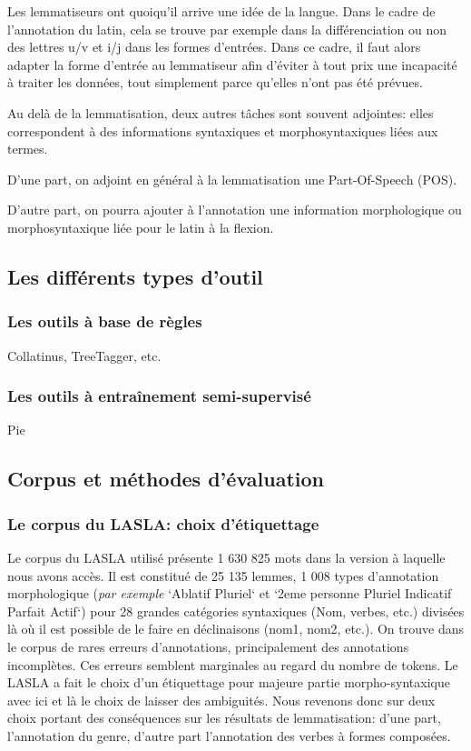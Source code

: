 Les lemmatiseurs ont quoiqu'il arrive une idée de la langue. Dans le cadre de l'annotation du latin, cela se trouve par exemple dans la différenciation ou non des lettres u/v et i/j dans les formes d'entrées. Dans ce cadre, il faut alors adapter la forme d'entrée au lemmatiseur afin d'éviter à tout prix une incapacité à traiter les données, tout simplement parce qu'elles n'ont pas été prévues.

Au delà de la lemmatisation, deux autres tâches sont souvent adjointes: elles correspondent à des informations syntaxiques et morphosyntaxiques liées aux termes.

D'une part, on adjoint en général à la lemmatisation une Part-Of-Speech (POS).

D'autre part, on pourra ajouter à l'annotation une information morphologique ou morphosyntaxique liée pour le latin à la flexion.

\subsection{Les différents types d'outil}

\subsubsection{Les outils à base de règles}

Collatinus, TreeTagger, etc.

\subsubsection{Les outils à entraînement semi-supervisé}

Pie

\subsection{Corpus et méthodes d'évaluation}
\label{subsec:lemma_corpus}

\subsubsection{Le corpus du LASLA: choix d'étiquettage}

Le corpus du LASLA utilisé présente 1 630 825 mots dans la version à laquelle nous avons accès. Il est constitué de 25 135 lemmes, 1 008 types d'annotation morphologique (\textit{par exemple}  `Ablatif Pluriel` et `2eme personne Pluriel Indicatif Parfait Actif`) pour 28 grandes catégories syntaxiques (Nom, verbes, etc.) divisées là où il est possible de le faire en déclinaisons (nom1, nom2, etc.). On trouve dans le corpus de rares erreurs d'annotations, principalement des annotations incomplètes. Ces erreurs semblent marginales au regard du nombre de tokens. Le LASLA a fait le choix d'un étiquettage pour majeure partie morpho-syntaxique avec ici et là le choix de laisser des ambiguités. Nous revenons donc sur deux choix portant des conséquences sur les résultats de lemmatisation: d'une part, l'annotation du genre, d'autre part l'annotation des verbes à formes composées.

